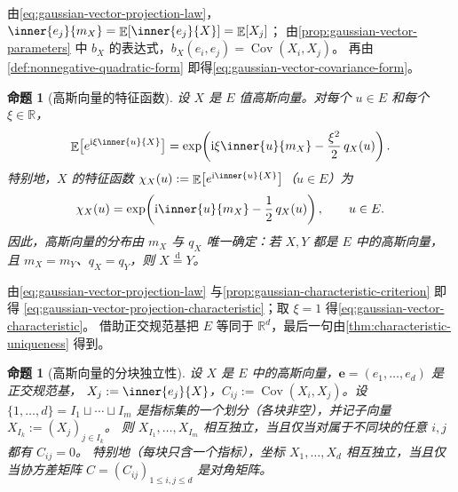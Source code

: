 \documentclass[UTF8,11pt,a4paper,oneside,fontset=fandol]{ctexrep}
\makeatletter
\numberwithin{equation}{section}
\theoremstyle{zhthm}
\newtheorem{proposition}[theorem]{命题}
\renewenvironment{proof}[1][\proofname]{\par
  \pushQED{\qed}%
  \normalfont\topsep6\p@\@plus6\p@\relax
  \trivlist
  \item[\hskip\labelsep\bfseries#1\hspace{0.5em}]\ignorespaces
}{%
  \popQED\endtrivlist\@endpefalse
}
\renewcommand{\proofname}{证明}
\newcommand{\R}{\mathbb{R}}
\DeclareMathOperator{\E}{\mathbb{E}}
\DeclareMathOperator{\Cov}{Cov}
\newcommand{\iu}{\mathrm{i}}
\newcommand{\deq}{\overset{\mathrm{d}}{=}}
\makeatother
\begin{document}
\begin{proof}
由\cref{eq:gaussian-vector-projection-law}，$\inner{e_j}{m_X}=\E[\inner{e_j}{X}]=\E[X_j]$；
由\cref{prop:gaussian-vector-parameters} 中 $b_X$ 的表达式，$b_X(e_i,e_j)=\Cov(X_i,X_j)$。
再由\cref{def:nonnegative-quadratic-form} 即得\cref{eq:gaussian-vector-covariance-form}。
\end{proof}

\begin{proposition}[高斯向量的特征函数]
\label{prop:gaussian-vector-characteristic}
设 $X$ 是 $E$ 值高斯向量。对每个 $u\in E$ 和每个 $\xi\in\R$，
\begin{equation}
  \label{eq:gaussian-vector-projection-characteristic}
  \E\bigl[e^{\iu\xi\inner{u}{X}}\bigr]
  =\exp\!\left(\iu\xi\inner{u}{m_X}-\frac{\xi^2}{2}\,q_X(u)\right).
\end{equation}
特别地，$X$ 的特征函数 $\chi_X(u):=\E\bigl[e^{\iu\inner{u}{X}}\bigr]$（$u\in E$）为
\begin{equation}
  \label{eq:gaussian-vector-characteristic}
  \chi_X(u)=\exp\!\left(\iu\inner{u}{m_X}-\frac12\,q_X(u)\right),\qquad u\in E.
\end{equation}
因此，高斯向量的分布由 $m_X$ 与 $q_X$ 唯一确定：若 $X,Y$ 都是 $E$ 中的高斯向量，
且 $m_X=m_Y$、$q_X=q_Y$，则 $X\deq Y$。
\end{proposition}

\begin{proof}
由\cref{eq:gaussian-vector-projection-law} 与\cref{prop:gaussian-characteristic-criterion} 即得%
\cref{eq:gaussian-vector-projection-characteristic}；取 $\xi=1$ 得\cref{eq:gaussian-vector-characteristic}。
借助正交规范基把 $E$ 等同于 $\R^d$，最后一句由\cref{thm:characteristic-uniqueness} 得到。
\end{proof}

\begin{proposition}[高斯向量的分块独立性]
\label{prop:gaussian-diagonal-independence}
设 $X$ 是 $E$ 中的高斯向量，$\mathbf e=(e_1,\ldots,e_d)$ 是正交规范基，
$X_j:=\inner{e_j}{X}$，$C_{ij}:=\Cov(X_i,X_j)$。设 $\{1,\ldots,d\}=I_1\sqcup\cdots\sqcup I_m$
是指标集的一个划分（各块非空），并记子向量 $X_{I_k}:=(X_j)_{j\in I_k}$。
则 $X_{I_1},\ldots,X_{I_m}$ 相互独立，当且仅当对属于不同块的任意 $i,j$ 都有 $C_{ij}=0$。
特别地（每块只含一个指标），坐标 $X_1,\ldots,X_d$ 相互独立，当且仅当协方差矩阵
$C=(C_{ij})_{1\le i,j\le d}$ 是对角矩阵。
\end{proposition}
\end{document}
